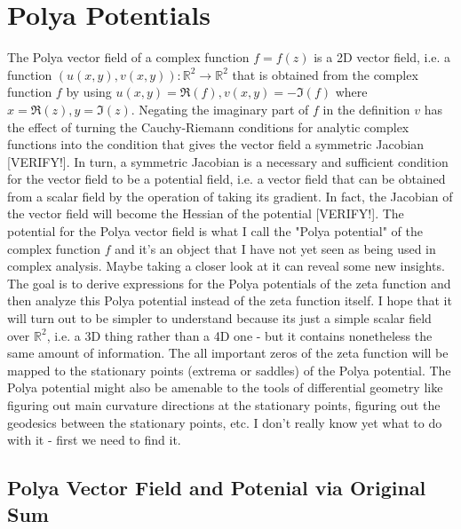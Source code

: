 \documentclass[12pt]{article}
\begin{document}
\section{Polya Potentials}
The Polya vector field of a complex function $f = f(z)$ is a 2D vector field, i.e. a function $(u(x,y), v(x,y)): \mathbb{R}^2 \rightarrow \mathbb{R}^2$ that is obtained from the complex function $f$ by using $u(x,y) = \Re(f), v(x,y) = -\Im(f)$ where $x = \Re(z), y = \Im(z)$. Negating the imaginary part of $f$ in the definition $v$ has the effect of turning the Cauchy-Riemann conditions for analytic complex functions into the condition that gives the vector field a symmetric Jacobian [VERIFY!]. In turn, a symmetric Jacobian is a necessary and sufficient condition for the vector field to be a potential field, i.e. a vector field that can be obtained from a scalar field by the operation of taking its gradient. In fact, the Jacobian of the vector field will become the Hessian of the potential [VERIFY!]. The potential for the Polya vector field is what I call the "Polya potential" of the complex function $f$ and it's an object that I have not yet seen as being used in complex analysis. Maybe taking a closer look at it can reveal some new insights. The goal is to derive expressions for the Polya potentials of the zeta function and then analyze this Polya potential instead of the zeta function itself. I hope that it will turn out to be simpler to understand because its just a simple scalar field over $\mathbb{R}^2$, i.e. a 3D thing rather than a 4D one - but it contains nonetheless the same amount of information. The all important zeros of the zeta function will be mapped to the stationary points (extrema or saddles) of the Polya potential. The Polya potential might also be amenable to the tools of differential geometry like figuring out main curvature directions at the stationary points, figuring out the geodesics between the stationary points, etc. I don't really know yet what to do with it - first we need to find it.

\subsection{Polya Vector Field and Potenial via Original Sum}
\end{document}
